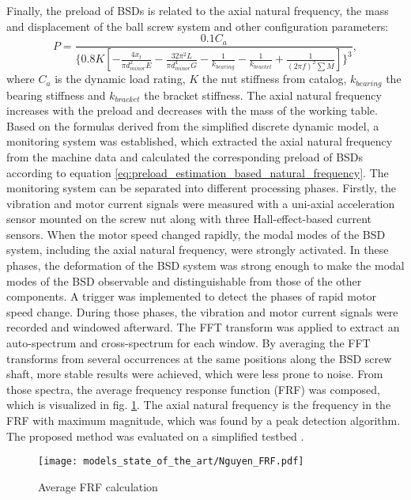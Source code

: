 Finally, the preload of BSDs is related to the axial natural frequency, the mass and displacement of the ball screw system and other configuration parameters:
\begin{equation}
    P=\frac{0.1C_{a}}{\{0.8K[ -\frac{4x_{t}}{\pi d_{minor}^{2}E} -\frac{32\pi^{2}L}{\pi d_{minor}^{4}G}-\frac{1}{k_{bearing}}-\frac{1}{k_{bracket}}+\frac{1}{(2\pi f)^{2}\sum M} ]\}^{3}},
\label{eq:preload_estimation_based_natural_frequency}
\end{equation}
where $C_{a}$ is the dynamic load rating, $K$ the nut stiffness from catalog, $k_{bearing}$ the bearing stiffness and $k_{bracket}$ the bracket stiffness. The axial natural frequency increases with the preload and decreases with the mass of the working table. Based on the formulas derived from the simplified discrete dynamic model, a monitoring system was established, which extracted the axial natural frequency from the machine data and calculated the corresponding preload of BSDs according to equation \ref{eq:preload_estimation_based_natural_frequency}. The monitoring system can be separated into different processing phases. Firstly, the vibration and motor current signals were measured with a uni-axial acceleration sensor mounted on the screw nut along with three Hall-effect-based current sensors. When the motor speed changed rapidly, the modal modes of the BSD system, including the axial natural frequency, were strongly activated. In these phases, the deformation of the BSD system was strong enough to make the modal modes of the BSD observable and distinguishable from those of the other components. A trigger was implemented to detect the phases of rapid motor speed change. During those phases, the vibration and motor current signals were recorded and windowed afterward. The FFT transform was applied to extract an auto-spectrum and cross-spectrum for each window. By averaging the FFT transforms from several occurrences at the same positions along the BSD screw shaft, more stable results were achieved, which were less prone to noise. From those spectra, the average frequency response function (FRF) was composed, which is visualized in fig. \ref{fig:Nguyen_frf}. The axial natural frequency is the frequency in the FRF with maximum magnitude, which was found by a peak detection algorithm. The proposed method was evaluated on a simplified testbed \cite{NGUYEN2019}.

\begin{figure}[H]
  \centering
  \texttt{[image: models\_state\_of\_the\_art/Nguyen\_FRF.pdf]}
  \caption{Average FRF calculation \cite{NGUYEN2019}}
  \label{fig:Nguyen_frf}
\end{figure}

